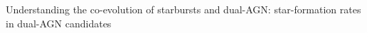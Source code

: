 Understanding the co-evolution of starbursts and dual-AGN: star-formation rates in dual-AGN candidates